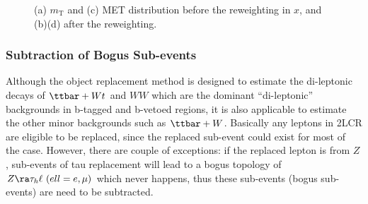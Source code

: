\begin{description}
\begin{figure}[h]
    \caption{ (a) $m_{\mathrm{T}}$ and (c) MET distribution before the reweighting in $x$, and (b)(d) after the reweighting.  \label{fig::BGestimation::objRep::mcClosure::rwgt_x_mt} }
\end{figure}



\end{description}


\clearpage



\clearpage
\subsubsection{Subtraction of Bogus Sub-events} \label{sec::BGestimation::objRep::subtraction}
Although the object replacement method is designed to estimate the di-leptonic decays of $\ttbar+Wt$ and $WW$ which are the dominant ``di-leptonic'' backgrounds in b-tagged and b-vetoed regions, it is also applicable to estimate the other minor backgrounds such as $\ttbar+W$. 
Basically any leptons in 2LCR are eligible to be replaced, since the replaced sub-event could exist for most of the case.
However, there are couple of exceptions: if the replaced lepton is from $Z$, sub-events of tau replacement will lead to a bogus topology of $Z\ra \tau_h \ell \,\, (ell=e,\mu)$ which never happens, thus these sub-events (bogus sub-events) are need to be subtracted.  \\

